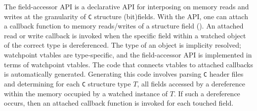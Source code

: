 \documentclass[letterpaper,twocolumn,10pt]{article}
\begin{document}


The field-accessor API is a declarative API for interposing on memory reads and writes at the granularity of \texttt{C} structure (bit)fields. With the API, one can attach a callback function to memory reads/writes of a structure field (). An attached read or write callback is invoked when the specific field within a watched object of the correct type is dereferenced. The type of an object is implicity resolved; watchpoint vtables are type-specific, and the field-accessor API is implemented in terms of watchpoint vtables. The code that connects vtables to attached callbacks is automatically generated. Generating this code involves parsing \texttt{C} header files and determining for each \texttt{C} structure type $T$, all fields accessed by a dereference within the memory occupied by a watched instance of $T$. If such a dereference occurs, then an attached callback function is invoked for each touched field.








\end{document}
